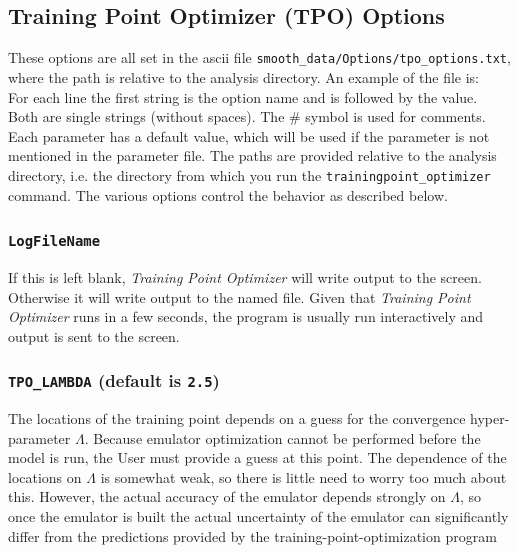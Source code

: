 \documentclass[UserManual.tex]{subfiles}
\begin{document}
\begin{sloppypar}
\subsection{Training Point Optimizer (TPO) Options}
These options are all set in the ascii file {\tt smooth\_data/Options/tpo\_options.txt}, where the path is relative to the analysis directory. An example of the file is:
{\tt
\vspace*{-8pt}{\tt \begin{Verbatim}[commandchars=\\\{\}]
#LogFileName               tpolog.txt  # comment out to direct output to screen
TPO_Method  MCQuadratic  # can be "MC", "MCSphere", "MCSimplex", "MCSimplexPlus1", "MCQuadratic", "MCSphereQuadratic"
TPO_NTrainingPts    0   # only relevant for OptimizeMethod="MCSphere" or "MC"
TPO_NMC  10000
TPO_ALPHA 0.01
TPO_LAMBDA 2.5
TPO_Include_LAMBDA_Uncertainty true
TPO_FullModelRunsDirName  smooth_data/FullModelRuns
TPO_RANSEED 12345
#TPO_ReadPoints 0,1,4-7,10,11-13,21
#TPO_FreezePoints 0,1,4-7,10,11-13,21
\end{Verbatim}
}\vspace*{-8pt}
}
For each line the first string is the option name and is followed by the value. Both are single strings (without spaces). The \# symbol is used for comments. Each parameter has a default value, which will be used if the parameter is not mentioned in the parameter file.  The paths are provided relative to the analysis directory, i.e. the directory from which you run the {\tt trainingpoint\_optimizer} command. The various options control the behavior as described below.

\subsubsection{{\tt LogFileName}}
If this is left blank, {\it Training Point Optimizer} will write output to the screen. Otherwise it will write output to the named file. Given that {\it Training Point Optimizer} runs in a few seconds, the program is usually run interactively and output is sent to the screen.
\subsubsection{{\tt TPO\_LAMBDA} (default is {\tt 2.5})}
The locations of the training point depends on a guess for the convergence hyper-parameter $\Lambda$. Because emulator optimization cannot be performed before the model is run, the User must provide a guess at this point. The dependence of the locations on $\Lambda$ is somewhat weak, so there is little need to worry too much about this. However, the actual accuracy of the emulator depends strongly on $\Lambda$, so once the emulator is built the actual uncertainty of the emulator can significantly differ from the predictions provided by the training-point-optimization program

\end{sloppypar}
\end{document}
